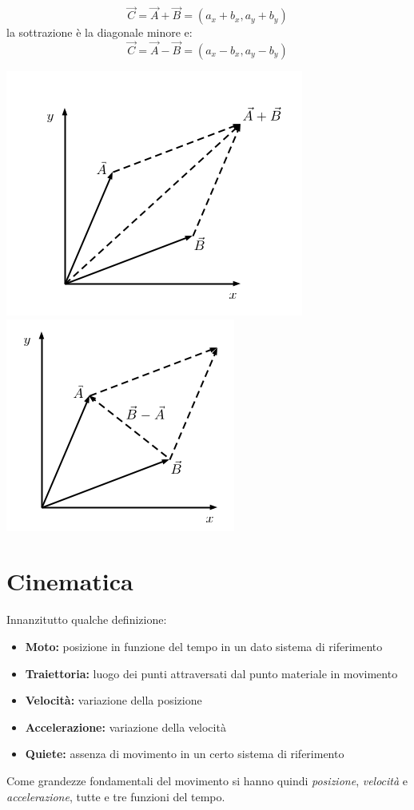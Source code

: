 \documentclass[a4paper,12pt, oneside]{book}
\begin{document}
$$\vec{C}=\vec{A}+\vec{B}=(a_x+b_x, a_y+b_y)$$
la sottrazione è la diagonale minore e:
$$\vec{C}=\vec{A}-\vec{B}=(a_x-b_x, a_y-b_y)$$
\begin{center}
\includegraphics[scale=0.5]{img/vec.png}
\quad
\includegraphics[scale=0.5]{img/vec2.png}
\end{center}
\section{Cinematica}
Innanzitutto qualche definizione:
\begin{itemize}
\item \textbf{Moto:} posizione in funzione del tempo in un dato sistema di riferimento
\item \textbf{Traiettoria:} luogo dei punti attraversati dal punto materiale in movimento
\item \textbf{Velocità:} variazione della posizione
\item \textbf{Accelerazione:} variazione della velocità
\item \textbf{Quiete:} assenza di movimento in un certo sistema di riferimento
\end{itemize}
Come grandezze fondamentali del movimento si hanno quindi \textit{posizione}, \textit{velocità} e \textit{accelerazione}, tutte e tre funzioni del tempo.
\end{document}
